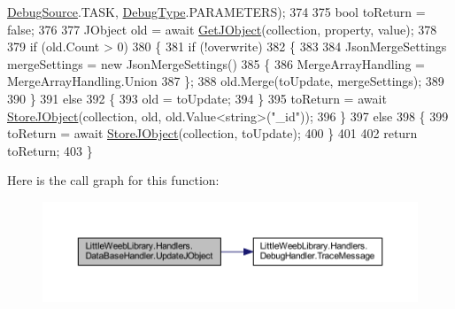 \begin{DoxyCode}
      \mbox{\hyperlink{namespace_little_weeb_library_1_1_handlers_a2a6ca0775121c9c503d58aa254d292be}{DebugSource}}.TASK, \mbox{\hyperlink{namespace_little_weeb_library_1_1_handlers_ab66019ed40462876ec4e61bb3ccb0a62}{DebugType}}.PARAMETERS);
374 
375             \textcolor{keywordtype}{bool} toReturn = \textcolor{keyword}{false};
376 
377             JObject old = await \mbox{\hyperlink{class_little_weeb_library_1_1_handlers_1_1_data_base_handler_a7f61583807f99b7838a33d2db0f7ca68}{GetJObject}}(collection, property, value);
378 
379             \textcolor{keywordflow}{if} (old.Count > 0)
380             \{
381                 \textcolor{keywordflow}{if} (!overwrite)
382                 \{
383 
384                     JsonMergeSettings mergeSettings = \textcolor{keyword}{new} JsonMergeSettings()
385                     \{
386                         MergeArrayHandling = MergeArrayHandling.Union
387                     \};
388                     old.Merge(toUpdate, mergeSettings);
389 
390                 \}
391                 \textcolor{keywordflow}{else}
392                 \{
393                     old = toUpdate;
394                 \}
395                 toReturn = await \mbox{\hyperlink{class_little_weeb_library_1_1_handlers_1_1_data_base_handler_a5e6a70ef81b049da46b6ae3a15b09cd3}{StoreJObject}}(collection, old, old.Value<\textcolor{keywordtype}{string}>(\textcolor{stringliteral}{"\_id"}));
396             \}
397             \textcolor{keywordflow}{else}
398             \{
399                 toReturn = await \mbox{\hyperlink{class_little_weeb_library_1_1_handlers_1_1_data_base_handler_a5e6a70ef81b049da46b6ae3a15b09cd3}{StoreJObject}}(collection, toUpdate);
400             \}
401 
402             \textcolor{keywordflow}{return} toReturn;
403         \}
\end{DoxyCode}
Here is the call graph for this function\+:\nopagebreak
\begin{figure}[H]
\begin{center}
\leavevmode
\includegraphics[width=350pt]{class_little_weeb_library_1_1_handlers_1_1_data_base_handler_ae1bd1078fc9253555322dc0609c49863_cgraph}
\end{center}
\end{figure}


